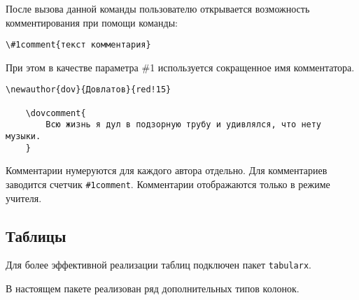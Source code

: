 После вызова данной команды пользователю открывается возможность комментирования при помощи команды:

\begin{lstlisting}[gobble = 3]
    \#1comment{текст комментария}
\end{lstlisting}

При этом в качестве параметра \#1 используется сокращенное имя комментатора.


\begin{lstlisting}[gobble = 3]
    \newauthor{dov}{Довлатов}{red!15}

    \dovcomment{
        Всю жизнь я дул в подзорную трубу и удивлялся, что нету музыки.
    }
\end{lstlisting}

\vspace{0.2cm}


    
Комментарии нумеруются для каждого автора отдельно. Для комментариев заводится счетчик
\texttt{\#1comment}. Комментарии отображаются только в режиме учителя.




\subsection{Таблицы}
\label{sec:tables}

Для более эффективной реализации таблиц подключен пакет \texttt{tabularx}.


В настоящем пакете реализован ряд дополнительных типов колонок.

\vspace{0.4cm}

